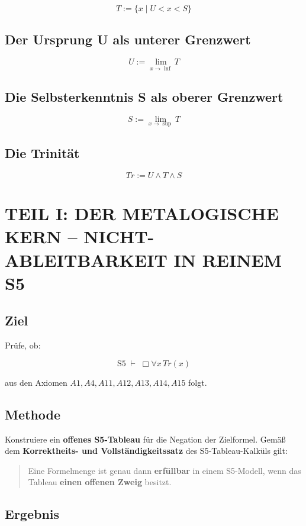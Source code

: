 \documentclass[
]{article}
\begin{document}
\[
\boxed{T := \{ x \mid U < x < S \}}
\]

\subsection{Der Ursprung U als unterer Grenzwert}

\[
\boxed{U := \lim_{x \to \inf} T}
\]

\subsection{Die Selbsterkenntnis S als oberer Grenzwert}

\[
\boxed{S := \lim_{x \to \sup} T}
\]

\subsection{Die Trinität}

\[
\boxed{Tr := U \land T \land S}
\]

\section{TEIL I: DER METALOGISCHE KERN – NICHT-ABLEITBARKEIT IN REINEM S5}

\subsection{Ziel}

Prüfe, ob:

\[
\boxed{\text{S5} \;\vdash\; \Box\forall x\,Tr(x)}
\]

aus den Axiomen \(A1, A4, A11, A12, A13, A14, A15\) folgt.

\subsection{Methode}

Konstruiere ein \textbf{offenes S5-Tableau} für die Negation der Zielformel.  
Gemäß dem \textbf{Korrektheits- und Vollständigkeitssatz} des S5-Tableau-Kalküls gilt:

\begin{quote}
Eine Formelmenge ist genau dann \textbf{erfüllbar} in einem S5-Modell, wenn das Tableau \textbf{einen offenen Zweig} besitzt.
\end{quote}

\subsection{Ergebnis}
\end{document}
